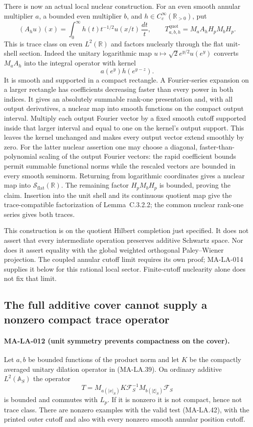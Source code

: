 There is now an actual local nuclear construction.  For an even
smooth annular multiplier $a$, a bounded even multiplier $b$,
and $h\in C_c^\infty(\mathbb R_{>0})$, put
\[
 (A_hu)(x)=\int_0^\infty h(t)t^{-1/2}u(x/t)\,\frac{dt}{t},
 \qquad
 T^{\mathrm{quot}}_{a,b,h}=M_a A_h H_pM_bH_p.
 \tag{MA-LA.53}
\]
This is trace class on even $L^2(\mathbb R)$ and factors
nuclearly through the flat unit-shell section.
Indeed the unitary logarithmic map
$u\mapsto\sqrt2e^{y/2}u(e^y)$ converts $M_aA_h$ into
the integral operator with kernel
\[
                  a(e^y)h(e^{y-z}).
 \tag{MA-LA.54}
\]
It is smooth and supported in a compact rectangle.
A Fourier-series expansion on a larger rectangle has coefficients
decreasing faster than every power in both indices.  It gives
an absolutely summable rank-one presentation and, with all output
derivatives, a nuclear map into smooth functions on the compact
output interval.  Multiply each output Fourier vector by a fixed
smooth cutoff supported inside that larger interval and equal to
one on the kernel's output support.  This leaves the kernel
unchanged and makes every output vector extend smoothly by zero.
For the latter nuclear assertion one may choose a
diagonal, faster-than-polynomial scaling of the output Fourier
vectors: the rapid coefficient bounds permit summable functional
norms while the rescaled vectors are bounded in every smooth
seminorm.  Returning from logarithmic coordinates gives a nuclear
map into $\mathcal S_{\mathrm{flat}}(\mathbb R)$.
The remaining factor $H_pM_bH_p$ is bounded, proving the claim.
Insertion into the unit shell and its continuous quotient map
give the trace-compatible factorization of Lemma~C.3.2.2;
the common nuclear rank-one series gives both traces.

This construction is on the quotient Hilbert completion just
specified.  It does not assert that every intermediate operation
preserves additive Schwartz space.  Nor does it assert equality
with the global weighted orthogonal Paley--Wiener projection.
The coupled annular cutoff limit requires its own proof;
MA-LA-014 supplies it below for this rational local sector.
Finite-cutoff nuclearity alone does not fix that limit.

\subsection{The full additive cover cannot supply a nonzero compact trace operator}

\paragraph{MA-LA-012 (unit symmetry prevents compactness on the cover).}
Let $a,b$ be bounded functions of the product norm and let
$K$ be the compactly averaged unitary dilation operator in
(MA-LA.39).  On ordinary additive $L^2(\mathbb A_S)$ the operator
\[
             T=M_{a(|x|_S)}K\mathcal F_S^{-1}
                         M_{b(|\xi|_S)}\mathcal F_S
 \tag{MA-LA.55}
\]
is bounded and commutes with $L_p$.
If it is nonzero it is not compact, hence not trace class.
There are nonzero examples with the valid test (MA-LA.42),
with the printed outer cutoff and also with every nonzero
smooth annular position cutoff.


